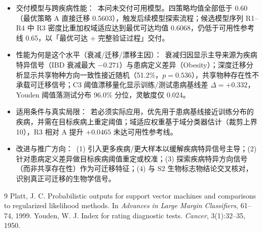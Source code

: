 \documentclass{internal-report}
\begin{document}
\begin{itemize}
  \item 交付模型与跨疾病性能：\ 本问未交付可用模型。四策略均值全部低于 0.60（最优策略 A 直接迁移 0.5603），触发后续模型探索流程；候选模型序列 R1--R4 中 R3 密度比重加权域适应达到最优可达均值 0.6068，仍低于可用性参考线 0.65，以「最优可达 + 完整验证过程」交付。
  \item 性能为何是这个水平（衰减/迁移/漂移主因）：\ 衰减归因显示主导来源为疾病特异信号（IBD 衰减最大 $-0.271$）与患病定义差异（Obesity）；深度迁移分析显示共享物种方向一致性接近随机（51.2\%，$p=0.536$），共享物种存在性不承载可迁移信号；C3 阈值漂移量化显示训练/测试患病基线差 $\Delta=+0.332$，Youden 阈值落测试分布 96.0\% 分位，灵敏度仅 0.024。
  \item 适用条件与真实局限：\ 若必须实际应用，优先用于患病基线接近训练分布的疾病，并需在目标疾病上重定阈值；域适应权重基于域分类器估计（裁剪上界 10），R3 相对 A 提升 $+0.0465$ 未达可用性参考线。
  \item 改进与推广方向：\ (1) 引入更多疾病/更大样本以缓解疾病特异信号主导；(2) 针对患病定义差异做目标疾病阈值重定或校准；(3) 探索疾病特异方向信号（而非共享存在性）作为可迁移特征；(4) 与 S2 生物标志物结论交叉核对，识别真正可迁移的生物学信号。
\end{itemize}


\begin{thebibliography}{9}
Platt, J. C. Probabilistic outputs for support vector machines and comparisons to regularized likelihood methods. In \emph{Advances in Large Margin Classifiers}, 61--74, 1999.
Youden, W. J. Index for rating diagnostic tests. \emph{Cancer}, 3(1):32--35, 1950.
\end{thebibliography}
\end{document}
